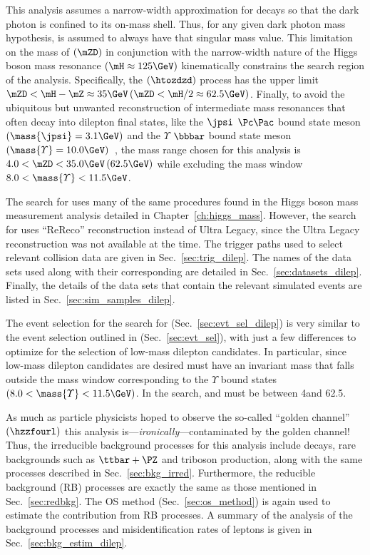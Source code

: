 This analysis assumes a narrow-width approximation for \PZD decays so that the dark photon is confined to its on-mass shell.
Thus, for any given dark photon mass hypothesis, \PZD is assumed to always have that singular mass value.
This limitation on the mass of \PZD $\left(\mZD\right)$ in conjunction with the narrow-width nature of the Higgs boson mass resonance $\left( \mH \approx 125\GeV \right)$ kinematically constrains the search region of the analysis.
Specifically, the \htozzd $\left(\htozdzd\right)$ process has the upper limit
$\mZD < \mH - \mZ \approx 35\GeV    \left(\mZD < \mH / 2 \approx 62.5\GeV\right)$.
Finally, to avoid the ubiquitous but unwanted reconstruction of intermediate mass resonances that often decay into dilepton final states,
like the $\jpsi$ $\Pc\Pac$ bound state meson $\left( \mass{\jpsi} = 3.1\GeV \right)$ and the $\varUpsilon$ $\bbbar$ bound state meson $\left( \mass{\varUpsilon} = 10.0\GeV \right)$~\cite{particle_data_group_review_2020},
the mass range chosen for this analysis is $4.0 < \mZD < 35.0\GeV \left(62.5\GeV\right)$ while excluding the mass window $8.0 < \mass{\varUpsilon} < 11.5\GeV$.

The search for \PZD uses many of the same procedures found in the Higgs boson mass measurement analysis detailed in Chapter~\ref{ch:higgs_mass}.
However, the search for \PZD uses ``ReReco'' reconstruction instead of Ultra Legacy, since the Ultra Legacy reconstruction was not available at the time.
The trigger paths used to select relevant \pp collision data are given in Sec.~\ref{sec:trig_dilep}.
The names of the data sets used along with their corresponding \lumiint are detailed in Sec.~\ref{sec:datasets_dilep}.
Finally, the details of the data sets that contain the relevant simulated events are listed in Sec.~\ref{sec:sim_samples_dilep}.

The event selection for the search for \PZD (Sec.~\ref{sec:evt_sel_dilep}) is very similar to the event selection outlined in (Sec.~\ref{sec:evt_sel}), with just a few differences to optimize for the selection of low-mass dilepton candidates.
In particular, since low-mass dilepton candidates are desired must have an invariant mass that falls outside the mass window corresponding to the $\varUpsilon$ \bbbar bound states $\left( 8.0 < \mass{\varUpsilon} < 11.5\GeV \right)$. 
In the \zdzd search, \mZone and \mZtwo must be between 4\GeV and 62.5\GeV.

As much as particle physicists hoped to observe the so-called ``golden channel'' $\left( \hzzfourl \right)$
this analysis is---\emph{ironically}---contaminated by the golden channel!
Thus, the irreducible background processes for this analysis include \htofourl decays, rare backgrounds such as $\ttbar + \PZ$ and triboson production, along with the same processes described in Sec.~\ref{sec:bkg_irred}.
Furthermore, the reducible background (RB) processes are exactly the same as those mentioned in Sec.~\ref{sec:redbkg}.
The OS method (Sec.~\ref{sec:os_method}) is again used to estimate the contribution from RB processes.
A summary of the analysis of the background processes and misidentification rates of leptons is given in Sec.~\ref{sec:bkg_estim_dilep}.

